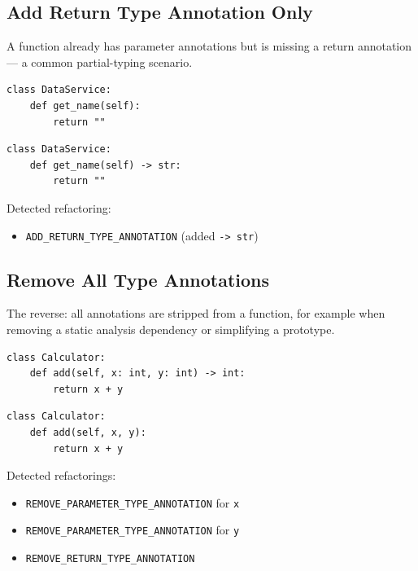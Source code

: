 \documentclass[11pt,a4paper]{article}
\newcommand{\code}[1]{\texttt{#1}}
\begin{document}
\subsection{Add Return Type Annotation Only}

A function already has parameter annotations but is missing a return annotation --- a common partial-typing scenario.

\begin{lstlisting}[caption={Before: missing return annotation.}]
class DataService:
    def get_name(self):
        return ""
\end{lstlisting}

\begin{lstlisting}[caption={After: return annotation added.}]
class DataService:
    def get_name(self) -> str:
        return ""
\end{lstlisting}

Detected refactoring:
\begin{itemize}[leftmargin=*]
  \item \code{ADD\_RETURN\_TYPE\_ANNOTATION} (added \code{-> str})
\end{itemize}

\subsection{Remove All Type Annotations}

The reverse: all annotations are stripped from a function, for example when removing a static analysis dependency or simplifying a prototype.

\begin{lstlisting}[caption={Before: fully annotated.}]
class Calculator:
    def add(self, x: int, y: int) -> int:
        return x + y
\end{lstlisting}

\begin{lstlisting}[caption={After: all annotations removed.}]
class Calculator:
    def add(self, x, y):
        return x + y
\end{lstlisting}

Detected refactorings:
\begin{itemize}[leftmargin=*]
  \item \code{REMOVE\_PARAMETER\_TYPE\_ANNOTATION} for \code{x}
  \item \code{REMOVE\_PARAMETER\_TYPE\_ANNOTATION} for \code{y}
  \item \code{REMOVE\_RETURN\_TYPE\_ANNOTATION}
\end{itemize}
\end{document}
